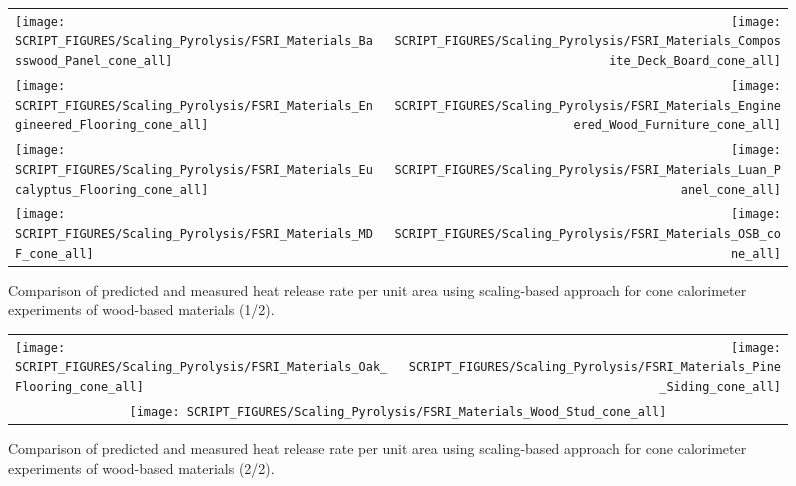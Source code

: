 \begin{figure}[p]
\begin{tabular*}{\textwidth}{l@{\extracolsep{\fill}}r}
\texttt{[image: SCRIPT\_FIGURES/Scaling\_Pyrolysis/FSRI\_Materials\_Basswood\_Panel\_cone\_all]} &
\texttt{[image: SCRIPT\_FIGURES/Scaling\_Pyrolysis/FSRI\_Materials\_Composite\_Deck\_Board\_cone\_all]} \\
\texttt{[image: SCRIPT\_FIGURES/Scaling\_Pyrolysis/FSRI\_Materials\_Engineered\_Flooring\_cone\_all]} &
\texttt{[image: SCRIPT\_FIGURES/Scaling\_Pyrolysis/FSRI\_Materials\_Engineered\_Wood\_Furniture\_cone\_all]} \\
\texttt{[image: SCRIPT\_FIGURES/Scaling\_Pyrolysis/FSRI\_Materials\_Eucalyptus\_Flooring\_cone\_all]} &
\texttt{[image: SCRIPT\_FIGURES/Scaling\_Pyrolysis/FSRI\_Materials\_Luan\_Panel\_cone\_all]} \\
\texttt{[image: SCRIPT\_FIGURES/Scaling\_Pyrolysis/FSRI\_Materials\_MDF\_cone\_all]} &
\texttt{[image: SCRIPT\_FIGURES/Scaling\_Pyrolysis/FSRI\_Materials\_OSB\_cone\_all]} \\
\end{tabular*}
\caption[Heat release rate per unit area of FSRI materials using scaling model, wood-based materials]
{Comparison of predicted and measured heat release rate per unit area using scaling-based approach for cone calorimeter experiments of wood-based materials (1/2).}
\label{FSRI_Materials_woods1}
\end{figure}

\begin{figure}[p]
\begin{tabular*}{\textwidth}{l@{\extracolsep{\fill}}r}
\texttt{[image: SCRIPT\_FIGURES/Scaling\_Pyrolysis/FSRI\_Materials\_Oak\_Flooring\_cone\_all]} &
\texttt{[image: SCRIPT\_FIGURES/Scaling\_Pyrolysis/FSRI\_Materials\_Pine\_Siding\_cone\_all]} \\
 \multicolumn{2}{c}{\texttt{[image: SCRIPT\_FIGURES/Scaling\_Pyrolysis/FSRI\_Materials\_Wood\_Stud\_cone\_all]}}
\end{tabular*}
\caption[Heat release rate per unit area of FSRI materials using scaling model, wood-based materials]
{Comparison of predicted and measured heat release rate per unit area using scaling-based approach for cone calorimeter experiments of wood-based materials (2/2).}
\label{FSRI_Materials_woods2}
\end{figure}

\clearpage

